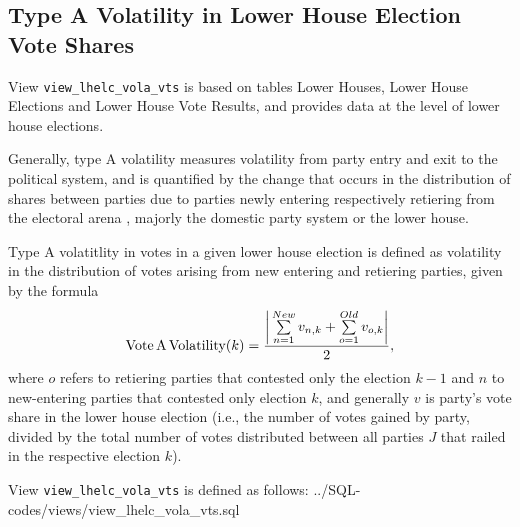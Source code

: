 \subsection{Type A Volatility in Lower House Election Vote Shares}\label{subsec_view_lhelc_vola_vts}

View \texttt{view\_lhelc\_vola\_vts} is based on tables Lower Houses, Lower House Elections and Lower House Vote Results, and provides data at the level of lower house elections.

Generally, type A volatility measures volatility from party entry and exit to the political system, and is quantified by the change that occurs in the distribution of shares between parties due to parties newly entering respectively retiering from the electoral arena \citep{Powell&Tucker2013}, majorly the domestic party system or the lower house. 

Type A volatitlity in votes in a given lower house election is defined as volatility in the distribution of votes arising from new entering and retiering parties, given by the formula 
\begin{equation}\label{equ_vote_a_volatility}
\mbox{Vote\,A\,Volatility}(k) = \frac{ \bigg| \sum\limits_{n=1}^{New} v_{n,k} + \sum\limits_{o=1}^{Old} v_{o,k} \bigg| }{2},
\end{equation}
where $o$ refers to retiering parties that contested only the election $k-1$ and $n$ to new-entering
parties that contested only election $k$, and generally $v$ is party's vote share in the lower house election (i.e., the number of votes gained by party, divided by the total number of votes distributed between all parties $J$ that railed in the respective election $k$).

View \texttt{view\_lhelc\_vola\_vts} is defined as follows:
%
{../SQL-codes/views/view_lhelc_vola_vts.sql}

